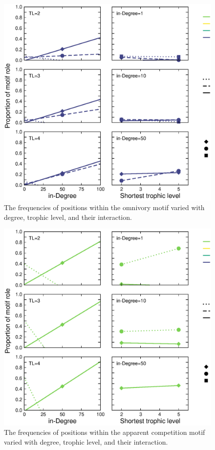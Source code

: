 \documentclass[12pt]{article}
\begin{document}
\begin{spacing}{2.0}
    
            \begin{figure}[h!]
                \centering
                \includegraphics[width=.75\textwidth]{figures/positions_byTL_Omnivory.eps}
                \caption{The frequencies of positions within the omnivory motif varied with degree, trophic level, and their interaction.}
                \label{omnivory_DT}
            \end{figure}
    
    
            \begin{figure}[h!]
                \centering
                \includegraphics[width=.75\textwidth]{figures/positions_byTL_Apparentcompetition.eps}
                \caption{The frequencies of positions within the apparent competition motif varied with degree, trophic level, and their interaction.}
                \label{appcomp_DT}
            \end{figure}
    

\end{spacing}
\end{document}
